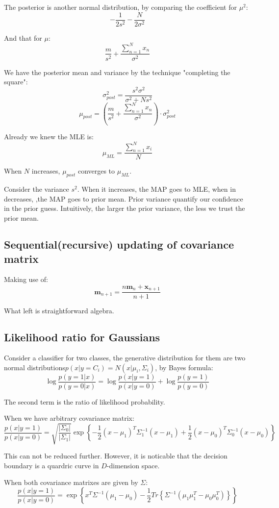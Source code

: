\documentclass[UTF8]{ctexart}
\begin{document}
The posterior is another normal distribution, by comparing the coefficient for $\mu^{2}$:
$$-\frac{1}{2s^{2}}-\frac{N}{2\sigma^{2}}$$

And that for $\mu$:
$$\frac{m}{s^{2}}+\frac{\sum_{n=1}^{N}x_{n}}{\sigma^{2}}$$

We have the posterior mean and variance by the technique "completing the square":
$$\sigma^{2}_{post} = \frac{s^{2}\sigma^{2}}{\sigma^{2}+Ns^{2}}$$
$$\mu_{post} = (\frac{m}{s^{2}}+\frac{\sum_{n=1}^{N}x_{n}}{\sigma^{2}})\cdot \sigma^{2}_{post}$$

Already we knew the MLE is:
$$\mu_{ML}=\frac{\sum_{n=1}^{N}x_{i}}{N}$$

When $N$ increases, $\mu_{post}$ converges to $\mu_{ML}$.

Consider the variance $s^{2}$. When it increases, the MAP goes to MLE, when in decreases, ,the MAP goes to prior mean. Prior variance quantify our confidence in the prior guess. Intuitively, the larger the prior variance, the less we trust the prior mean.

\subsection{Sequential(recursive) updating of covariance matrix}
Making use of:
$$\textbf{m}_{n+1}=\frac{n\textbf{m}_{n}+\textbf{x}_{n+1}}{n+1}$$

What left is straightforward algebra.

\subsection{Likelihood ratio for Gaussians}
Consider a classifier for two classes, the generative distribution for them are two normal distributions$p(x|y=C_{i})=N(x|\mu_{i},\Sigma_{i})$, by Bayes formula:
$$\log \frac{p(y=1|x)}{p(y=0|x)} = \log \frac{p(x|y=1)}{p(x|y=0)} + \log \frac{p(y=1)}{p(y=0)}$$

The second term is the ratio of likelihood probability.

When we have arbitrary covariance matrix:
$$\frac{p(x|y=1)}{p(x|y=0)} = \sqrt{\frac{|\Sigma_{0}|}{|\Sigma_{1}|}}\exp\left\{ -\frac{1}{2}(x-\mu_{1})^{T}\Sigma_{1}^{-1}(x-\mu_{1}) + \frac{1}{2}(x-\mu_{0})^{T}\Sigma_{0}^{-1}(x-\mu_{0}) \right\}$$

This can not be reduced further. However, it is noticable that the decision boundary is a quardric curve in $D$-dimension space.

When both covariance matrixes are given by $\Sigma$:
$$\frac{p(x|y=1)}{p(x|y=0)} = \exp\left\{x^{T}\Sigma^{-1}(\mu_{1}-\mu_{0})-\frac{1}{2}Tr\left\{ \Sigma^{-1}(\mu_{1}\mu_{1}^{T}-\mu_{0}\mu_{0}^{T}) \right\} \right\}$$
\end{document}
